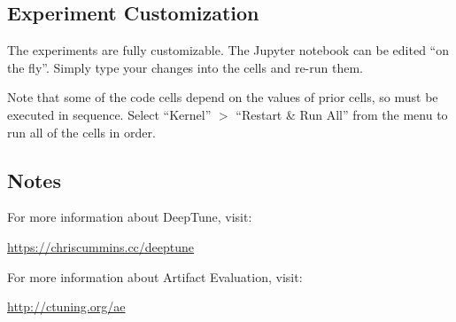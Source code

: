 \subsection{Experiment Customization}

The experiments are fully customizable. The Jupyter notebook can be edited ``on
the fly''. Simply type your changes into the cells and re-run them.

\noindent Note that some of the code cells depend on the values of prior cells,
so must be executed in sequence. Select ``Kernel'' $>$ ``Restart \& Run All''
from the menu to run all of the cells in order.


\subsection{Notes}
\noindent For more information about DeepTune, visit:

\url{https://chriscummins.cc/deeptune}

\noindent For more information about Artifact Evaluation, visit:

\url{http://ctuning.org/ae}

\raggedend
